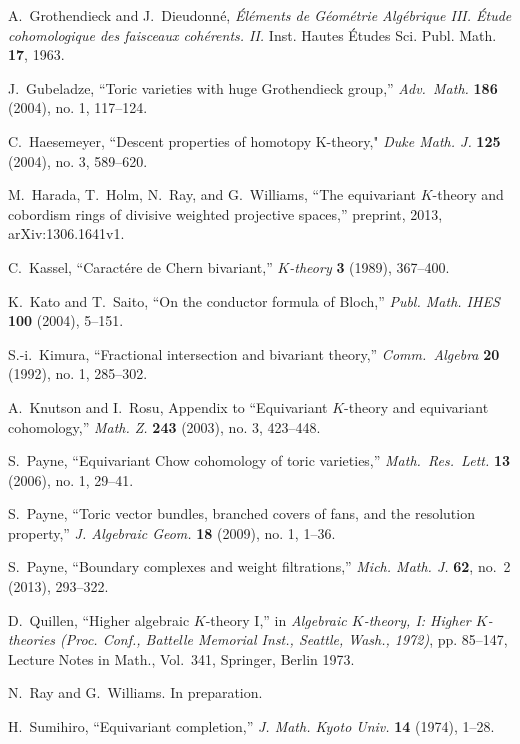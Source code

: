 \documentclass[11pt]{amsart}
\theoremstyle{definition}
\begin{document}
\begin{thebibliography}{CHWW}
 A.~Grothendieck and J.~Dieudonn\'e, \emph{\'El\'ements de G\'eom\'etrie Alg\'ebrique III. \'Etude cohomologique des faisceaux coh\'erents. II.} Inst. Hautes \'Etudes Sci. Publ. Math. {\bf 17}, 1963.

 J.~Gubeladze, ``Toric varieties with huge Grothendieck group,'' {\em Adv.~Math.} {\bf 186} (2004), no. 1, 117--124.

 C.~Haesemeyer, ``Descent properties of homotopy K-theory," {\em Duke Math. J.} {\bf 125} (2004), no. 3, 589--620. 

 M.~Harada, T.~Holm, N.~Ray, and G.~Williams, ``The equivariant $K$-theory and cobordism rings of divisive weighted projective spaces,'' preprint, 2013, arXiv:1306.1641v1.

 C.~Kassel, ``Caract\'ere de Chern bivariant,'' {\em $K$-theory} {\bf 3} (1989), 367--400.

 K.~Kato and T.~Saito, ``On the conductor formula of Bloch,'' {\em Publ. Math. IHES} {\bf 100} (2004), 5--151.

 S.-i.~Kimura, ``Fractional intersection and bivariant theory,''
{\em Comm.~Algebra} {\bf 20} (1992), no. 1, 285--302.

 A.~Knutson and I.~Rosu, Appendix to ``Equivariant $K$-theory and equivariant cohomology,'' {\em Math. Z.} {\bf 243} (2003), no. 3, 423--448.

 S.~Payne, ``Equivariant Chow cohomology of toric varieties,'' {\em Math.~Res.~Lett.} {\bf 13} (2006), no. 1, 29--41.

 S.~Payne, ``Toric vector bundles, branched covers of fans, and the resolution property,'' {\em J. Algebraic Geom.} {\bf 18} (2009), no. 1, 1--36.

 S.~Payne, ``Boundary complexes and weight filtrations,'' {\em Mich. Math. J.} {\bf 62}, no.~2 (2013), 293--322.

 D.~Quillen, ``Higher algebraic $K$-theory I,'' in {\em  Algebraic $K$-theory, I: Higher $K$-theories (Proc. Conf., Battelle Memorial Inst., Seattle, Wash., 1972)}, pp. 85--147, Lecture Notes in Math., Vol.~341, Springer, Berlin 1973.

 N.~Ray and G.~Williams. In preparation.

 H.~Sumihiro, ``Equivariant completion,'' {\em J. Math. Kyoto Univ.} {\bf 14} (1974), 1--28. 


\end{thebibliography}
\end{document}
